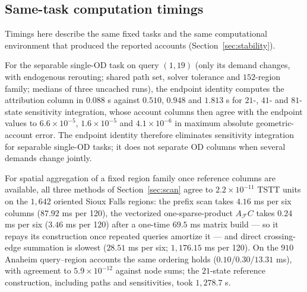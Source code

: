 \subsection{Same-task computation timings}\label{supp:timing}
Timings here describe the same fixed tasks and the same computational
environment that produced the reported accounts
(Section~\ref{sec:stability}).

For the separable single-OD task on query $(1,19)$ (only its demand
changes, with endogenous rerouting; shared path set, solver tolerance
and $152$-region family; medians of three uncached runs), the endpoint
identity computes the attribution column in $0.088$ s against $0.510$,
$0.948$ and $1.813$ s for $21$-, $41$- and $81$-state sensitivity
integration, whose account columns then agree with the endpoint values
to $6.6\times10^{-5}$, $1.6\times10^{-5}$ and
$4.1\times10^{-6}$ in maximum absolute geometric-account error. The
endpoint identity therefore eliminates sensitivity integration for
separable single-OD tasks; it does not separate OD columns when
several demands change jointly.

For spatial aggregation of a fixed region family once reference
columns are available, all three methods of
Section~\ref{sec:scan} agree to $2.2\times10^{-11}$ TSTT units on the
$1{,}642$ oriented Sioux Falls regions: the prefix scan takes
$4.16$ ms per six columns ($87.92$ ms per 120), the vectorized
one-sparse-product $A_{\mathcal F}C$ takes $0.24$ ms per six
($3.46$ ms per 120) after a one-time $69.5$ ms matrix build --- so it
repays its construction once repeated queries amortize it --- and
direct crossing-edge summation is slowest ($28.51$ ms per six;
$1{,}176.15$ ms per 120). On the $910$ Anaheim query--region accounts
the same ordering holds ($0.10$/$0.30$/$13.31$ ms), with agreement
to $5.9\times10^{-12}$ against node sums; the $21$-state reference
construction, including paths and sensitivities, took $1{,}278.7$ s.









